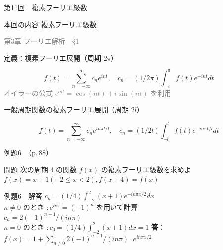 \documentclass[professionalfonts]{beamer}
\begin{document}
\begin{frame}{第11回　複素フーリエ級数}
  \begin{block}{本回の内容}
  複素フーリエ級数
  \end{block}
  \vfill\hfill{\scriptsize \textcolor{gray}{第3章 フーリエ解析　§1}}
\end{frame}

\begin{frame}{定義：複素フーリエ展開（周期 $2\pi$）}
  \begin{block}{}
  \[
    f(t) = \sum_{n=-\infty}^{\infty} c_{n} e^{int}, \quad
    c_{n} = (1/2\pi) \int_{-\pi}^{\pi} f(t) e^{-int} dt
  \]
  {\footnotesize \textcolor{gray}{オイラーの公式 $e^{int} = \cos(nt) + i \sin(nt)$ を利用}}
  \end{block}
\end{frame}

\begin{frame}{一般周期関数の複素フーリエ展開（周期 $2l$）}
  \begin{block}{}
  \[
    f(t) = \sum_{n=-\infty}^{\infty} c_{n} e^{in\pi t/l}, \quad
    c_{n} = (1/2l) \int_{-l}^{l} f(t) e^{-in\pi t/l} dt
  \]
  \end{block}
\end{frame}

\begin{frame}{例題6　（p.\,88）}
  \begin{exampleblock}{問題}
    次の周期 4 の関数 $f(x)$ の複素フーリエ級数を求めよ\\[2pt]
    $f(x) = x + 1  (-2 \leq x < 2),  f(x+4) = f(x)$\\[2pt]
  \end{exampleblock}
\end{frame}

\begin{frame}{例題6　解答}
  $c_{n} = (1/4) \int_{-2}^{2} (x+1) e^{-in\pi x/2} dx$\\[4pt]
  $n \neq 0$ のとき $: e^{in\pi} = (-1)^n$ を用いて計算\\[4pt]
  $c_{n} = 2(-1)^{n+1} / (in\pi)$\\[4pt]
  $n = 0$ のとき $: c_{0} = (1/4)\int_{-2}^{2}(x+1)dx = 1$
  \medskip\textbf{答}：$f(x) = 1 + \sum_{n\neq0} 2(-1)^{n+1}/(in\pi) \cdot e^{in\pi x/2}$
\end{frame}
\end{document}

